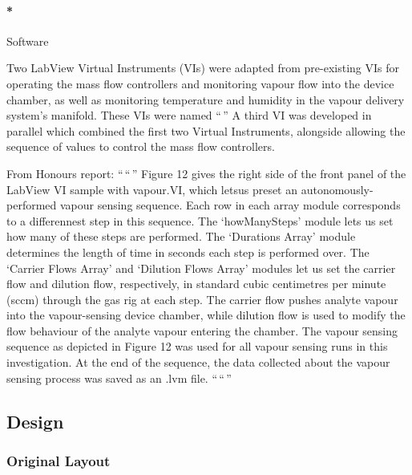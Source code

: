 \documentclass[
  letterpaper,
  DIV=11,
  numbers=noendperiod]{scrartcl}
\let\oldparagraph\paragraph
\renewcommand{\paragraph}[1]{\oldparagraph{#1}\mbox{}}
\begin{document}
\hypertarget{software}{%
\paragraph*{Software}\label{software}}

Two LabView Virtual Instruments (VIs) were adapted from pre-existing VIs
for operating the mass flow controllers and monitoring vapour flow into
the device chamber, as well as monitoring temperature and humidity in
the vapour delivery system's manifold. These VIs were named ``\,'' A
third VI was developed in parallel which combined the first two Virtual
Instruments, alongside allowing the sequence of values to control the
mass flow controllers.

From Honours report: ``\,``\,'' Figure 12 gives the right side of the
front panel of the LabView VI sample with vapour.VI, which letsus preset
an autonomously-performed vapour sensing sequence. Each row in each
array module corresponds to a differennest step in this sequence. The
`howManySteps' module lets us set how many of these steps are performed.
The `Durations Array' module determines the length of time in seconds
each step is performed over. The `Carrier Flows Array' and `Dilution
Flows Array' modules let us set the carrier flow and dilution flow,
respectively, in standard cubic centimetres per minute (sccm) through
the gas rig at each step. The carrier flow pushes analyte vapour into
the vapour-sensing device chamber, while dilution flow is used to modify
the flow behaviour of the analyte vapour entering the chamber. The
vapour sensing sequence as depicted in Figure 12 was used for all vapour
sensing runs in this investigation. At the end of the sequence, the data
collected about the vapour sensing process was saved as an .lvm file.
``\,``\,''

\hypertarget{design}{%
\subsection{Design}\label{design}}

\hypertarget{original-layout}{%
\subsubsection{Original Layout}\label{original-layout}}
\end{document}
